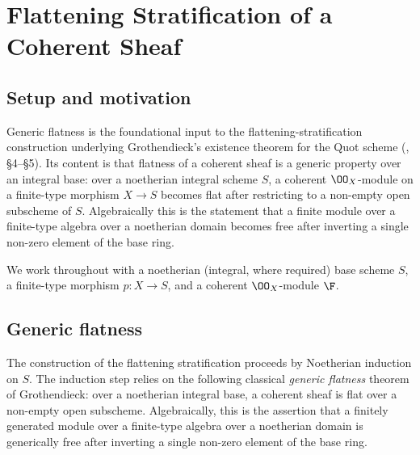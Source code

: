 \chapter{Flattening Stratification of a Coherent Sheaf}
\label{chap:Picard_FlatteningStratification}


\section{Setup and motivation}
\label{sec:flatstrat_setup}

Generic flatness is the foundational input to the flattening-stratification
construction underlying Grothendieck's existence theorem for the Quot scheme
(\cite{nitsure-hilbert-quot}, \S4--\S5).  Its content is that flatness of a
coherent sheaf is a generic property over an integral base: over a noetherian
integral scheme \(S\), a coherent \(\OO_X\)-module on a finite-type morphism
\(X \to S\) becomes flat after restricting to a non-empty open subscheme of
\(S\). Algebraically this is the statement that a finite module over a
finite-type algebra over a noetherian domain becomes free after inverting a
single non-zero element of the base ring.

We work throughout with a noetherian (integral, where required) base scheme
\(S\), a finite-type morphism \(p : X \to S\), and a coherent \(\OO_X\)-module
\(\F\).

\section{Generic flatness}
\label{sec:generic_flatness}

The construction of the flattening stratification proceeds by Noetherian
induction on \(S\). The induction step relies on the following classical
\emph{generic flatness} theorem of Grothendieck: over a noetherian integral
base, a coherent sheaf is flat over a non-empty open subscheme. Algebraically,
this is the assertion that a finitely generated module over a finite-type
algebra over a noetherian domain is generically free after inverting a single
non-zero element of the base ring.

